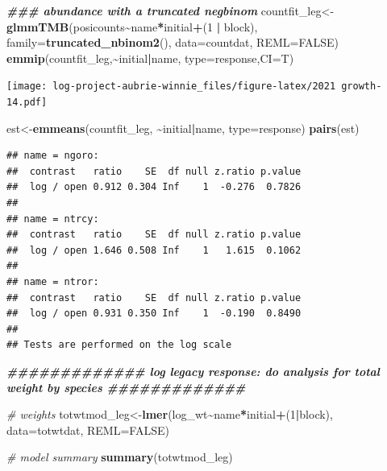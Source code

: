 \documentclass[
]{article}
\newenvironment{Shaded}{\begin{snugshade}}{\end{snugshade}}
\newcommand{\AttributeTok}[1]{\textcolor[rgb]{0.13,0.29,0.53}{#1}}
\newcommand{\CommentTok}[1]{\textcolor[rgb]{0.56,0.35,0.01}{\textit{#1}}}
\newcommand{\ConstantTok}[1]{\textcolor[rgb]{0.56,0.35,0.01}{#1}}
\newcommand{\DecValTok}[1]{\textcolor[rgb]{0.00,0.00,0.81}{#1}}
\newcommand{\DocumentationTok}[1]{\textcolor[rgb]{0.56,0.35,0.01}{\textbf{\textit{#1}}}}
\newcommand{\FunctionTok}[1]{\textcolor[rgb]{0.13,0.29,0.53}{\textbf{#1}}}
\newcommand{\NormalTok}[1]{#1}
\newcommand{\OtherTok}[1]{\textcolor[rgb]{0.56,0.35,0.01}{#1}}
\newcommand{\SpecialCharTok}[1]{\textcolor[rgb]{0.81,0.36,0.00}{\textbf{#1}}}
\newcommand{\StringTok}[1]{\textcolor[rgb]{0.31,0.60,0.02}{#1}}
\begin{document}
\begin{Shaded}
\begin{Highlighting}[]
\DocumentationTok{\#\#\# abundance with a truncated negbinom }
\NormalTok{countfit\_leg}\OtherTok{\textless{}{-}}\FunctionTok{glmmTMB}\NormalTok{(posicounts}\SpecialCharTok{\textasciitilde{}}\NormalTok{name}\SpecialCharTok{*}\NormalTok{initial}\SpecialCharTok{+}\NormalTok{(}\DecValTok{1} \SpecialCharTok{|}\NormalTok{ block), }\AttributeTok{family=}\FunctionTok{truncated\_nbinom2}\NormalTok{(), }\AttributeTok{data=}\NormalTok{countdat, }\AttributeTok{REML=}\ConstantTok{FALSE}\NormalTok{)}
\FunctionTok{emmip}\NormalTok{(countfit\_leg,}\SpecialCharTok{\textasciitilde{}}\NormalTok{initial}\SpecialCharTok{|}\NormalTok{name, }\AttributeTok{type=}\StringTok{\textquotesingle{}response\textquotesingle{}}\NormalTok{,}\AttributeTok{CI=}\NormalTok{T)}
\end{Highlighting}
\end{Shaded}

\texttt{[image: log-project-aubrie-winnie\_files/figure-latex/2021 growth-14.pdf]}

\begin{Shaded}
\begin{Highlighting}[]
\NormalTok{est}\OtherTok{\textless{}{-}}\FunctionTok{emmeans}\NormalTok{(countfit\_leg, }\SpecialCharTok{\textasciitilde{}}\NormalTok{initial}\SpecialCharTok{|}\NormalTok{name, }\AttributeTok{type=}\StringTok{\textquotesingle{}response\textquotesingle{}}\NormalTok{)}
\FunctionTok{pairs}\NormalTok{(est)}
\end{Highlighting}
\end{Shaded}

\begin{verbatim}
## name = ngoro:
##  contrast   ratio    SE  df null z.ratio p.value
##  log / open 0.912 0.304 Inf    1  -0.276  0.7826
## 
## name = ntrcy:
##  contrast   ratio    SE  df null z.ratio p.value
##  log / open 1.646 0.508 Inf    1   1.615  0.1062
## 
## name = ntror:
##  contrast   ratio    SE  df null z.ratio p.value
##  log / open 0.931 0.350 Inf    1  -0.190  0.8490
## 
## Tests are performed on the log scale
\end{verbatim}

\begin{Shaded}
\begin{Highlighting}[]
\DocumentationTok{\#\#\#\#\#\#\#\#\#\#\#\#\# log legacy response: do analysis for total weight by species \#\#\#\#\#\#\#\#\#\#\#\#\# }

\CommentTok{\# weights}
\NormalTok{totwtmod\_leg}\OtherTok{\textless{}{-}}\FunctionTok{lmer}\NormalTok{(log\_wt}\SpecialCharTok{\textasciitilde{}}\NormalTok{name}\SpecialCharTok{*}\NormalTok{initial}\SpecialCharTok{+}\NormalTok{(}\DecValTok{1}\SpecialCharTok{|}\NormalTok{block), }\AttributeTok{data=}\NormalTok{totwtdat, }\AttributeTok{REML=}\ConstantTok{FALSE}\NormalTok{)}

\CommentTok{\# model summary}
\FunctionTok{summary}\NormalTok{(totwtmod\_leg)}
\end{Highlighting}
\end{Shaded}
\end{document}
